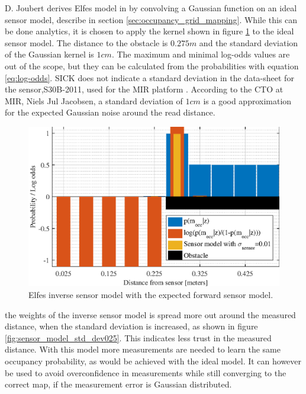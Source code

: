 D. Joubert derives Elfes model in \cite{Joubert2014} by convolving a Gaussian function on an ideal sensor model, describe in section \vref{sec:occupancy_grid_mapping}. While this can be done analytics, it is chosen to apply the kernel shown in figure \ref{fig:sensor_model_std_dev01} to the ideal sensor model.
The distance to the obstacle is $0.275m$ and the standard deviation of the Gaussian kernel is $1cm$. 
The maximum and minimal log-odds values are out of the scope, but they can be calculated from the probabilities with equation \ref{eq:log-odds}.
SICK does not indicate a standard deviation in the data-sheet for the sensor,S30B-2011, used for the MIR platform \cite{lidarDatasheet}.
According to the CTO at MIR, Niels Jul Jacobsen, a standard deviation of $1cm$ is a good approximation for the expected Gaussian noise around the read distance. 

\begin{figure}
	\centering
	\includegraphics[scale=1.0]{figures/static_mapping/sensor_model_std_dev01}
	\caption{Elfes inverse sensor model with the expected forward sensor model.}
	\label{fig:sensor_model_std_dev01}
\end{figure}

the weights of the inverse sensor model is spread more out around the measured distance, when the standard deviation is increased, as shown in figure \ref{fig:sensor_model_std_dev025}. 
This indicates less trust in the measured distance. With this model more measurements are needed to learn the same occupancy probability, as would be achieved with the ideal model. It can however be used to avoid overconfidence in measurements while still converging to the correct map, if the measurement error is Gaussian distributed.

